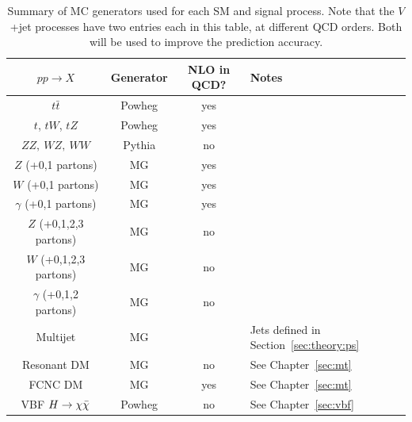 \begin{table}[]
\begin{center}
    \caption{Summary of MC generators used for each SM and signal process.
             Note that the ${V}$+jet processes have two entries each in this table, at different QCD orders.
             Both will be used to improve the prediction accuracy.}
    \label{tab:theory:sim}
    \begin{tabular}{c|c|c|l}
        ${pp\rightarrow X}$ & Generator & NLO in QCD? & Notes \\ \hline \hline
        ${t\bar{t}}$ & Powheg & yes \\ 
        ${t}$, ${tW}$, ${tZ}$ & Powheg & yes \\ 
        \hline
        ${ZZ,~WZ,~WW}$ & Pythia &  no \\ 
        \hline
        ${Z}$ (+0,1 partons) & MG  & yes  \\ 
        ${W}$ (+0,1 partons) & MG  & yes \\ 
        ${\gamma}$ (+0,1 partons) & MG  & yes  \\ 
        \hline
        ${Z}$ (+0,1,2,3 partons) & MG  & no \\ 
        ${W}$ (+0,1,2,3 partons) & MG  & no  \\ 
        ${\gamma}$ (+0,1,2 partons) & MG  & no \\ 
        Multijet & MG && Jets defined in Section~\ref{sec:theory:ps} \\
        \hline
        Resonant DM & MG & no & See Chapter~\ref{sec:mt} \\ 
        FCNC DM & MG &yes& See Chapter~\ref{sec:mt} \\ 
        VBF ${H\rightarrow\chi\bar\chi}$ & Powheg &no & See Chapter~\ref{sec:vbf} \\ 
    \end{tabular}
\end{center}
\end{table}

